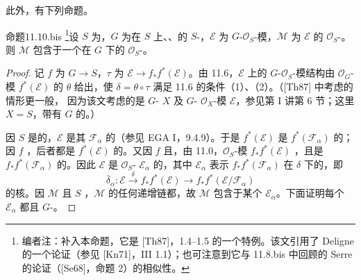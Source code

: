 此外，有下列命题。
\begin{SGAresult}{命题}{11.10.bis}
\footnote{编者注：补入本命题，它是 [Th87]，1.4--1.5 的一个特例。该文引用了 Deligne 的一个论证（参见 [Kn71]，III  1.1）；也可注意到它与 11.8.bis 中回顾的 Serre 的论证（[Se68]，命题 2）的相似性。}设 $S$ 为，$G$ 为在 $S$ 上、、的 $S$-，$\mathcal E$ 为 $G$-$\mathcal O_S$-模，$\mathcal M$ 为 $\mathcal E$ 的 $\mathcal O_S$-。则 $\mathcal M$ 包含于一个在 $G$ 下的 $\mathcal O_S$-。
\end{SGAresult}
\begin{proof}
记 $f$ 为 $G\to S$，$\tau$ 为 $\mathcal E\to f_*f^*(\mathcal E)$。由 11.6，$\mathcal E$ 上的 $G$-$\mathcal O_S$-模结构由 $\mathcal O_G$-模 $f^*(\mathcal E)$ 的 $\theta$ 给出，使 $\delta=\theta\circ\tau$ 满足 11.6 的条件（1）、（2）。（[Th87] 中考虑的情形更一般，
因为该文考虑的是 $G$- $X$ 及 $G$- $\mathcal O_X$-模 $\mathcal E$，参见第 I 讲第 6 节；这里 $X=S$，带有 $G$ 的。）

因 $S$ 是的，$\mathcal E$ 是其 $\mathcal F_\alpha$ 的（参见 EGA I，9.4.9）。于是 $f^*(\mathcal E)$ 是 $f^*(\mathcal F_\alpha)$ 的；因 $f$ ，后者都是 $f^*(\mathcal E)$ 的。又因 $f$ 且，由 11.0，$\mathcal O_S$-模 $f_*f^*(\mathcal E)$ ，且是 $f_*f^*(\mathcal F_\alpha)$ 的。因此 $\mathcal E$ 是 $\mathcal O_S$- $\mathcal E_\alpha$ 的，其中 $\mathcal E_\alpha$ 表示 $f_*f^*(\mathcal F_\alpha)$ 在 $\delta$ 下的，即
\[
\overline\delta_\alpha:\mathcal E\xrightarrow{\delta}f_*f^*(\mathcal E)
\longrightarrow f_*f^*(\mathcal E/\mathcal F_\alpha)
\]
的核。因 $\mathcal M$ 且 $S$ ，$\mathcal M$ 的任何递增链都，故 $\mathcal M$ 包含于某个 $\mathcal E_\alpha$。下面证明每个 $\mathcal E_\alpha$ 都且 $G$-。


\end{proof}
